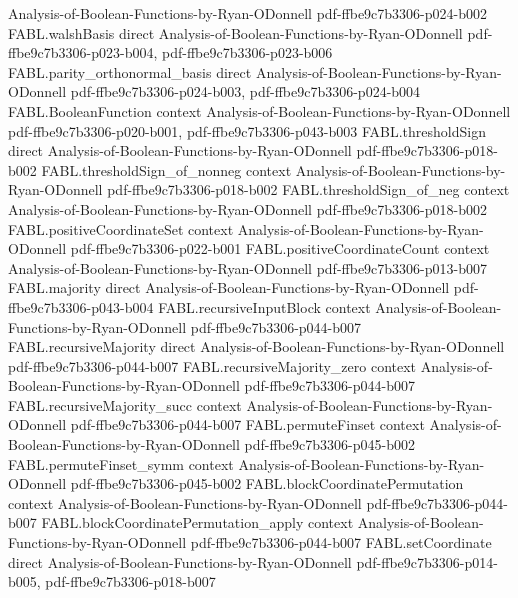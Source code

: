 \begin{theorem}
  {Analysis-of-Boolean-Functions-by-Ryan-ODonnell}
  {pdf-ffbe9c7b3306-p024-b002}
\proofstep
  {FABL.walshBasis}
  {direct}
  {Analysis-of-Boolean-Functions-by-Ryan-ODonnell}
  {pdf-ffbe9c7b3306-p023-b004,
    pdf-ffbe9c7b3306-p023-b006}
\proofstep
  {FABL.parity_orthonormal_basis}
  {direct}
  {Analysis-of-Boolean-Functions-by-Ryan-ODonnell}
  {pdf-ffbe9c7b3306-p024-b003,
    pdf-ffbe9c7b3306-p024-b004}
\proofstep
  {FABL.BooleanFunction}
  {context}
  {Analysis-of-Boolean-Functions-by-Ryan-ODonnell}
  {pdf-ffbe9c7b3306-p020-b001,
    pdf-ffbe9c7b3306-p043-b003}
\proofstep
  {FABL.thresholdSign}
  {direct}
  {Analysis-of-Boolean-Functions-by-Ryan-ODonnell}
  {pdf-ffbe9c7b3306-p018-b002}
\proofstep
  {FABL.thresholdSign_of_nonneg}
  {context}
  {Analysis-of-Boolean-Functions-by-Ryan-ODonnell}
  {pdf-ffbe9c7b3306-p018-b002}
\proofstep
  {FABL.thresholdSign_of_neg}
  {context}
  {Analysis-of-Boolean-Functions-by-Ryan-ODonnell}
  {pdf-ffbe9c7b3306-p018-b002}
\proofstep
  {FABL.positiveCoordinateSet}
  {context}
  {Analysis-of-Boolean-Functions-by-Ryan-ODonnell}
  {pdf-ffbe9c7b3306-p022-b001}
\proofstep
  {FABL.positiveCoordinateCount}
  {context}
  {Analysis-of-Boolean-Functions-by-Ryan-ODonnell}
  {pdf-ffbe9c7b3306-p013-b007}
\proofstep
  {FABL.majority}
  {direct}
  {Analysis-of-Boolean-Functions-by-Ryan-ODonnell}
  {pdf-ffbe9c7b3306-p043-b004}
\proofstep
  {FABL.recursiveInputBlock}
  {context}
  {Analysis-of-Boolean-Functions-by-Ryan-ODonnell}
  {pdf-ffbe9c7b3306-p044-b007}
\proofstep
  {FABL.recursiveMajority}
  {direct}
  {Analysis-of-Boolean-Functions-by-Ryan-ODonnell}
  {pdf-ffbe9c7b3306-p044-b007}
\proofstep
  {FABL.recursiveMajority_zero}
  {context}
  {Analysis-of-Boolean-Functions-by-Ryan-ODonnell}
  {pdf-ffbe9c7b3306-p044-b007}
\proofstep
  {FABL.recursiveMajority_succ}
  {context}
  {Analysis-of-Boolean-Functions-by-Ryan-ODonnell}
  {pdf-ffbe9c7b3306-p044-b007}
\proofstep
  {FABL.permuteFinset}
  {context}
  {Analysis-of-Boolean-Functions-by-Ryan-ODonnell}
  {pdf-ffbe9c7b3306-p045-b002}
\proofstep
  {FABL.permuteFinset_symm}
  {context}
  {Analysis-of-Boolean-Functions-by-Ryan-ODonnell}
  {pdf-ffbe9c7b3306-p045-b002}
\proofstep
  {FABL.blockCoordinatePermutation}
  {context}
  {Analysis-of-Boolean-Functions-by-Ryan-ODonnell}
  {pdf-ffbe9c7b3306-p044-b007}
\proofstep
  {FABL.blockCoordinatePermutation_apply}
  {context}
  {Analysis-of-Boolean-Functions-by-Ryan-ODonnell}
  {pdf-ffbe9c7b3306-p044-b007}
\proofstep
  {FABL.setCoordinate}
  {direct}
  {Analysis-of-Boolean-Functions-by-Ryan-ODonnell}
  {pdf-ffbe9c7b3306-p014-b005,
    pdf-ffbe9c7b3306-p018-b007}

\end{theorem}
